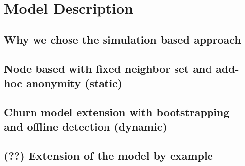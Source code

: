 \chapter{Model Description}

\section{Why we chose the simulation based approach}



\section{Node based with fixed neighbor set and add-hoc anonymity (static)}



\section{Churn model extension with bootstrapping and offline detection (dynamic)}
\section{(??) Extension of the model by example}
